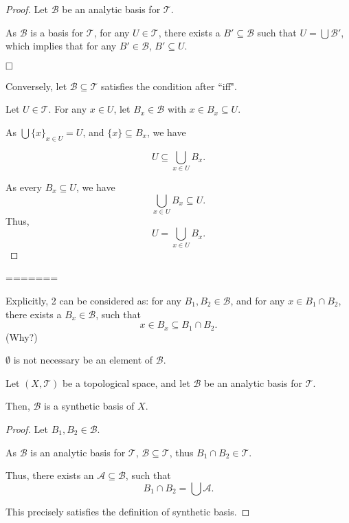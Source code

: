 \documentclass{report}
\begin{document}
\begin{proof}
	Let $\mathcal B$ be an analytic basis for $\mathcal T$.
	
	As $\mathcal B$ is a basis for $\mathcal T$, for any $U \in \mathcal T$, there exists a $B' \subseteq \mathcal B$ such that $U = \bigcup \mathcal B'$, which implies that for any $B' \in \mathcal B$, $B' \subseteq U$.
	
	$\qedlm$
	
	Conversely, let $\mathcal B \subseteq \mathcal T$ satisfies the condition after ``iff".
	
	Let $U \in \mathcal T$. For any $x \in U$, let $B_x \in \mathcal B$ with $x \in B_x \subseteq U$.
	
	As $\bigcup \{x\}_{x \in U} = U$, and $\{x\} \subseteq B_x$, we have
	
	$$
	U \subseteq \bigcup_{x \in U} B_x.
	$$
	
	As every $B_x \subseteq U$, we have
	$$
	\bigcup_{x \in U} B_x \subseteq U.
	$$
	Thus,
	$$
	U = \bigcup_{x \in U} B_x.
	$$
\end{proof}


=======


\begin{note}
	Explicitly, 2 can be considered as: for any $B_1, B_2 \in \mathcal B$, and for any $x \in B_1 \cap B_2$, there exists a $B_x \in \mathcal B$, such that
	$$
	x \in B_x \subseteq B_1 \cap B_2.
	$$
	(Why?)
\end{note}


\begin{note}
	$\emptyset$ is not necessary be an element of $\mathcal B$.
\end{note}


\begin{lemma}
	Let $(X, \mathcal T)$ be a topological space, and let $\mathcal B$ be an analytic basis for $\mathcal T$.
	
	Then, $\mathcal B$ is a synthetic basis of $X$.
\end{lemma}


\begin{proof}
	Let $B_1, B_2 \in \mathcal B$.

	As $\mathcal B$ is an analytic basis for $\mathcal T$, $\mathcal B \subseteq \mathcal T$, thus $B_1 \cap B_2 \in \mathcal T$.
	
	Thus, there exists an $\mathcal A \subseteq \mathcal B$, such that
	$$
	B_1 \cap B_2 = \bigcup \mathcal A.
	$$
	
	This precisely satisfies the definition of synthetic basis.
\end{proof}
\end{document}
